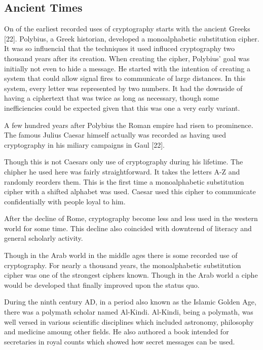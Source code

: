 \documentclass{article}
\begin{document}
    \subsection{Ancient Times}

    On of the earliest recorded uses of cryptography starts with the ancient Greeks [22].
    Polybius, a Greek historian, developed a monoalphabetic substitution cipher. It
    was so influencial that the techniques it used influced cryptography two thousand
    years after its creation.
    When creating the cipher, Polybius' goal was initially not even to hide a message.
    He started with the intention of creating a system that could allow signal fires
    to communicate of large distances. In this system, every letter was represented
    by two numbers. It had the downside of having a ciphertext that was twice as long
    as necessary, though some inefficiencies could be expected given that this
    was one a very early variant.

    A few hundred years after Polybius the Roman empire had risen to prominence.
    The famous Julius Caesar himself actually was recorded as having used cryptography
    in his miliary campaigns in Gaul [22].

    Though this is not Caesars only use of cryptography during his lifetime.
    The chipher he used here was fairly straightforward. It takes the letters A-Z
    and randomly reorders them. This is the first time a monoalphabetic substitution
    cipher with a shifted alphabet was used.
    Caesar used this cipher to communicate confidentially with people loyal to him.

    After the decline of Rome, cryptography become less and less used in the western
    world for some time.
    This decline also coincided with downtrend of literacy and general scholarly activity.

    Though in the Arab world in the middle ages there is some recorded use of cryptography.
    For nearly a thousand years, the monoalphabetic substitution cipher was one
    of the strongest ciphers known. Though in the Arab world a ciphe would be developed
    that finally improved upon the status quo.

    During the ninth century AD, in a period also known as the Islamic Golden Age,
    there was a polymath scholar named Al-Kindi. Al-Kindi, being a polymath, was
    well versed in various scientific disciplines which included astronomy, philosophy
    and medicine amoung other fields. He also authored a book intended for
    secretaries in royal counts which showed how secret messages can be used.
\end{document}

